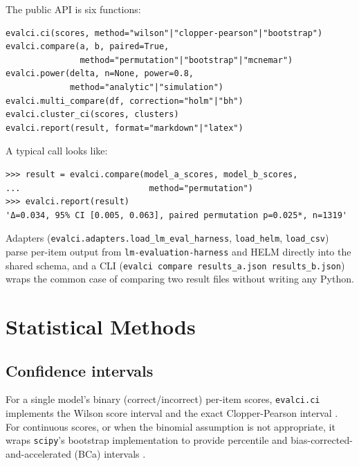 \documentclass[11pt]{article}
\begin{document}
The public API is six functions:

\begin{lstlisting}
evalci.ci(scores, method="wilson"|"clopper-pearson"|"bootstrap")
evalci.compare(a, b, paired=True,
               method="permutation"|"bootstrap"|"mcnemar")
evalci.power(delta, n=None, power=0.8,
             method="analytic"|"simulation")
evalci.multi_compare(df, correction="holm"|"bh")
evalci.cluster_ci(scores, clusters)
evalci.report(result, format="markdown"|"latex")
\end{lstlisting}

\noindent A typical call looks like:

\begin{lstlisting}
>>> result = evalci.compare(model_a_scores, model_b_scores,
...                          method="permutation")
>>> evalci.report(result)
'Δ=0.034, 95% CI [0.005, 0.063], paired permutation p=0.025*, n=1319'
\end{lstlisting}

Adapters (\texttt{evalci.adapters.load\_lm\_eval\_harness},
\texttt{load\_helm}, \texttt{load\_csv}) parse per-item output from
\texttt{lm-evaluation-harness} and HELM directly into the shared schema, and a
CLI (\texttt{evalci compare results\_a.json results\_b.json}) wraps the common
case of comparing two result files without writing any Python.

\section{Statistical Methods}
\label{sec:methods}

\subsection{Confidence intervals}
For a single model's binary (correct/incorrect) per-item scores,
\texttt{evalci.ci} implements the Wilson score interval
\citep{wilson1927} and the exact Clopper-Pearson interval
\citep{clopperpearson1934}. For continuous scores, or when the binomial
assumption is not appropriate, it wraps \texttt{scipy}'s bootstrap
implementation \citep{virtanen2020scipy} to provide percentile and
bias-corrected-and-accelerated (BCa) intervals \citep{efron1979,efrontibshirani1993}.
\end{document}
